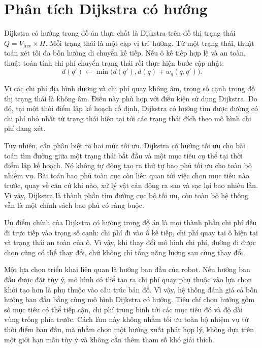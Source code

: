 \documentclass[../DoAn.tex]{subfiles}
\begin{document}
\section{Phân tích Dijkstra có hướng}

Dijkstra có hướng trong đồ án thực chất là Dijkstra trên đồ thị trạng thái $Q=V_{\text{free}}\times H$. Mỗi trạng thái là một cặp vị trí--hướng. Từ một trạng thái, thuật toán xét tối đa bốn hướng di chuyển kế tiếp. Nếu ô kế tiếp hợp lệ và an toàn, thuật toán tính chi phí chuyển trạng thái rồi thực hiện bước cập nhật:
\begin{equation}
d(q') \leftarrow \min\bigl(d(q'), d(q)+w_q(q,q')\bigr).
\end{equation}

Vì các chi phí địa hình dương và chi phí quay không âm, trọng số cạnh trong đồ thị trạng thái là không âm. Điều này phù hợp với điều kiện sử dụng Dijkstra. Do đó, tại một thời điểm lập kế hoạch cố định, Dijkstra có hướng tìm được đường có chi phí nhỏ nhất từ trạng thái hiện tại tới các trạng thái đích theo mô hình chi phí đang xét.

Tuy nhiên, cần phân biệt rõ hai mức tối ưu. Dijkstra có hướng tối ưu cho bài toán tìm đường giữa một trạng thái bắt đầu và một mục tiêu cụ thể tại thời điểm lập kế hoạch. Nó không tự động tạo ra thứ tự bao phủ tối ưu cho toàn bộ nhiệm vụ. Bài toán bao phủ toàn cục còn liên quan tới việc chọn mục tiêu nào trước, quay về căn cứ khi nào, xử lý vật cản động ra sao và sạc lại bao nhiêu lần. Vì vậy, Dijkstra là thành phần tìm đường cục bộ tối ưu, còn toàn bộ hệ thống vẫn là một chính sách bao phủ có ràng buộc.

Ưu điểm chính của Dijkstra có hướng trong đồ án là mọi thành phần chi phí đều đi trực tiếp vào trọng số cạnh: chi phí đi vào ô kế tiếp, chi phí quay tại ô hiện tại và trạng thái an toàn của ô. Vì vậy, khi thay đổi mô hình chi phí, đường đi được chọn cũng có thể thay đổi, chứ không chỉ tổng năng lượng sau cùng thay đổi.

Một lựa chọn triển khai liên quan là hướng ban đầu của robot. Nếu hướng ban đầu được đặt tùy ý, mô hình có thể tạo ra chi phí quay phụ thuộc vào lựa chọn khởi tạo hơn là phụ thuộc vào cấu trúc bản đồ. Vì vậy, hệ thống đánh giá cả bốn hướng ban đầu bằng cùng mô hình Dijkstra có hướng. Tiêu chí chọn hướng gồm số mục tiêu có thể tiếp cận, chi phí trung bình tới các mục tiêu đó và độ dài vùng trống phía trước. Cách làm này không nhằm tối ưu toàn bộ nhiệm vụ từ thời điểm ban đầu, mà nhằm chọn một hướng xuất phát hợp lý, không dựa trên một giới hạn mẫu tùy ý và không cần thêm tham số khó giải thích.
\end{document}
